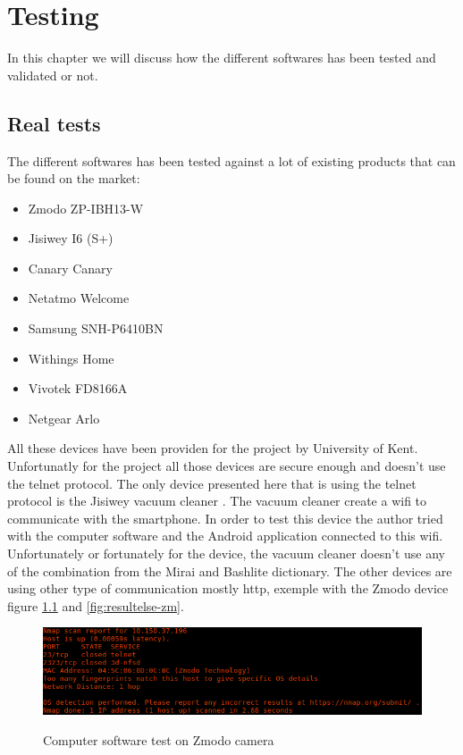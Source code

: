 \documentclass{report}
\begin{document}
\chapter{Testing}
In this chapter we will discuss how the different softwares has been tested and validated or not.

\section{Real tests}
The different softwares has been tested against a lot of existing products that can be found on the market:
\begin{itemize}
 \item Zmodo ZP-IBH13-W \autocite{zmodo}
 \item Jisiwey I6 (S+) \autocite{jisiwey}
 \item Canary Canary \autocite{canary}
 \item Netatmo Welcome \autocite{netatmo}
 \item Samsung SNH-P6410BN \autocite{samsung}
 \item Withings Home \autocite{withings}
 \item Vivotek FD8166A \autocite{vivotek}
 \item Netgear Arlo \autocite{netgear}
\end{itemize}
All these devices have been providen for the project by University of Kent. Unfortunatly for the project all those devices are secure enough and doesn't use the telnet protocol. The only device presented here that is using the telnet protocol is the Jisiwey vacuum cleaner \autocite{jisiwey}.\newline
The vacuum cleaner create a wifi to communicate with the smartphone. In order to test this device the author tried with the computer software and the Android application connected to this wifi. Unfortunately or fortunately for the device, the vacuum cleaner doesn't use any of the combination from the Mirai and Bashlite dictionary.\newline
The other devices are using other type of communication mostly http, exemple with the Zmodo device figure \ref{fig:result-zm} and \ref{fig:resultelse-zm}.
\begin{figure}[h]
 \caption{Computer software test on Zmodo \protect\footnotemark camera}
 \centering
 \includegraphics[width=1.2\textwidth]{./img/exp/result}
 \label{fig:result-zm}
\end{figure}
\end{document}
